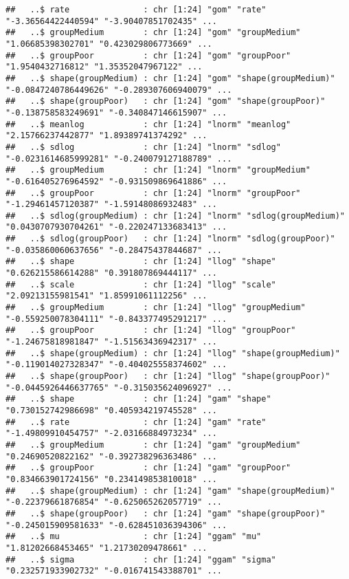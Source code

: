 \documentclass[
]{article}
\begin{document}
\begin{verbatim}
##   ..$ rate               : chr [1:24] "gom" "rate" "-3.36564422440594" "-3.90407851702435" ...
##   ..$ groupMedium        : chr [1:24] "gom" "groupMedium" "1.06685398302701" "0.423029806773669" ...
##   ..$ groupPoor          : chr [1:24] "gom" "groupPoor" "1.9540432716812" "1.35352047967122" ...
##   ..$ shape(groupMedium) : chr [1:24] "gom" "shape(groupMedium)" "-0.0847240786449626" "-0.289307606940079" ...
##   ..$ shape(groupPoor)   : chr [1:24] "gom" "shape(groupPoor)" "-0.138758583249691" "-0.340847146615907" ...
##   ..$ meanlog            : chr [1:24] "lnorm" "meanlog" "2.15766237442877" "1.89389741374292" ...
##   ..$ sdlog              : chr [1:24] "lnorm" "sdlog" "-0.0231614685999281" "-0.240079127188789" ...
##   ..$ groupMedium        : chr [1:24] "lnorm" "groupMedium" "-0.616405276964592" "-0.931509869641886" ...
##   ..$ groupPoor          : chr [1:24] "lnorm" "groupPoor" "-1.29461457120387" "-1.59148086932483" ...
##   ..$ sdlog(groupMedium) : chr [1:24] "lnorm" "sdlog(groupMedium)" "0.0430707930704261" "-0.220247133683413" ...
##   ..$ sdlog(groupPoor)   : chr [1:24] "lnorm" "sdlog(groupPoor)" "-0.035860060637656" "-0.28475437844687" ...
##   ..$ shape              : chr [1:24] "llog" "shape" "0.626215586614288" "0.391807869444117" ...
##   ..$ scale              : chr [1:24] "llog" "scale" "2.09213155981541" "1.85991061112256" ...
##   ..$ groupMedium        : chr [1:24] "llog" "groupMedium" "-0.559250078304111" "-0.843377495291217" ...
##   ..$ groupPoor          : chr [1:24] "llog" "groupPoor" "-1.24675818981847" "-1.51563436942317" ...
##   ..$ shape(groupMedium) : chr [1:24] "llog" "shape(groupMedium)" "-0.119014027328347" "-0.404025558374602" ...
##   ..$ shape(groupPoor)   : chr [1:24] "llog" "shape(groupPoor)" "-0.0445926446637765" "-0.315035624096927" ...
##   ..$ shape              : chr [1:24] "gam" "shape" "0.730152742986698" "0.405934219745528" ...
##   ..$ rate               : chr [1:24] "gam" "rate" "-1.49809910454757" "-2.03166884973234" ...
##   ..$ groupMedium        : chr [1:24] "gam" "groupMedium" "0.24690520822162" "-0.392738296363486" ...
##   ..$ groupPoor          : chr [1:24] "gam" "groupPoor" "0.834663901724156" "0.234149853810018" ...
##   ..$ shape(groupMedium) : chr [1:24] "gam" "shape(groupMedium)" "-0.22379661876854" "-0.625065262057719" ...
##   ..$ shape(groupPoor)   : chr [1:24] "gam" "shape(groupPoor)" "-0.245015909581633" "-0.628451036394306" ...
##   ..$ mu                 : chr [1:24] "ggam" "mu" "1.81202668453465" "1.21730209478661" ...
##   ..$ sigma              : chr [1:24] "ggam" "sigma" "0.232571933902732" "-0.016741543388701" ...

\end{verbatim}
\end{document}
